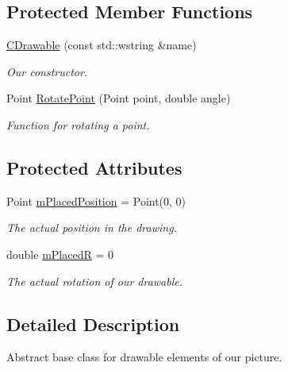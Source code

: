 \subsection*{Protected Member Functions}
\begin{DoxyCompactItemize}
\item 
\hyperlink{class_c_drawable_a2e153d7fd3a752139b0b87ea990a25fc}{C\+Drawable} (const std\+::wstring \&name)
\begin{DoxyCompactList}\small\item\em Our constructor. \end{DoxyCompactList}\item 
Point \hyperlink{class_c_drawable_a3dbe65175c065abcba67ea820b42c927}{Rotate\+Point} (Point point, double angle)
\begin{DoxyCompactList}\small\item\em Function for rotating a point. \end{DoxyCompactList}\end{DoxyCompactItemize}
\subsection*{Protected Attributes}
\begin{DoxyCompactItemize}
\item 
\hypertarget{class_c_drawable_af10549c681fe73d2f86885019a06d913}{Point \hyperlink{class_c_drawable_af10549c681fe73d2f86885019a06d913}{m\+Placed\+Position} = Point(0, 0)}\label{class_c_drawable_af10549c681fe73d2f86885019a06d913}

\begin{DoxyCompactList}\small\item\em The actual position in the drawing. \end{DoxyCompactList}\item 
\hypertarget{class_c_drawable_a3b280b16b1a4a8c6e2588b1dc5574bda}{double \hyperlink{class_c_drawable_a3b280b16b1a4a8c6e2588b1dc5574bda}{m\+Placed\+R} = 0}\label{class_c_drawable_a3b280b16b1a4a8c6e2588b1dc5574bda}

\begin{DoxyCompactList}\small\item\em The actual rotation of our drawable. \end{DoxyCompactList}\end{DoxyCompactItemize}


\subsection{Detailed Description}
Abstract base class for drawable elements of our picture. 


